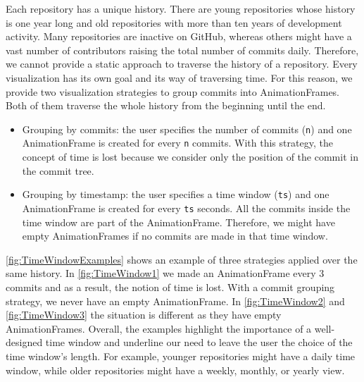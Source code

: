 Each repository has a unique history. There are young repositories whose history is one year long and old repositories with more than ten years of development activity. Many repositories are inactive on GitHub, whereas others might have a vast number of contributors raising the total number of commits daily. Therefore, we cannot provide a static approach to traverse the history of a repository. 
Every visualization has its own goal and its way of traversing time. For this reason, we provide two visualization strategies to group commits into AnimationFrames. Both of them traverse the whole history from the beginning until the end.
\begin{itemize}
    \item{Grouping by commits}: the user specifies the number of commits (\texttt{n}) and one AnimationFrame is created for every \texttt{n} commits. With this strategy, the concept of time is lost because we consider only the position of the commit in the commit tree.
    \item{Grouping by timestamp}: the user specifies a time window (\texttt{ts}) and one AnimationFrame is created for every \texttt{ts} seconds. All the commits inside the time window are part of the AnimationFrame. Therefore, we might have empty AnimationFrames if no commits are made in that time window.
\end{itemize}

\autoref{fig:TimeWindowExamples} shows an example of three strategies applied over the same history. In \autoref{fig:TimeWindow1} we made an AnimationFrame every 3 commits and as a result, the notion of time is lost. With a commit grouping strategy, we never have an empty AnimationFrame. In \autoref{fig:TimeWindow2} and \autoref{fig:TimeWindow3} the situation is different as they have empty AnimationFrames.
Overall, the examples highlight the importance of a well-designed time window and underline our need to leave the user the choice of the time window's length. For example, younger repositories might have a daily time window, while older repositories might have a weekly, monthly, or yearly view. 

